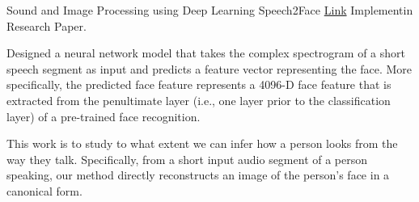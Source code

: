 

\begin{cventries}

  \cventry
    {Sound and Image Processing using Deep Learning} %
    {Speech2Face} %
    {\href{https://github.com/ravising-h/Speech2Face}{Link}} %
    {Implementin Research Paper.} %
    {
      \begin{cvitems} %
        \item Designed a neural network model that takes the complex spectrogram of a short speech segment as input and predicts a feature vector representing the face. More specifically, the predicted face feature represents a 4096-D face feature that is extracted from the penultimate layer (i.e., one layer prior to the classification layer) of a pre-trained face recognition.
        \item  This work is to study to what extent we can infer how a person looks from the way they talk. Specifically, from a short input audio segment of a person speaking, our method directly reconstructs an image of the person’s face in a canonical form.
       \end{cvitems}
    }



\end{cventries}
